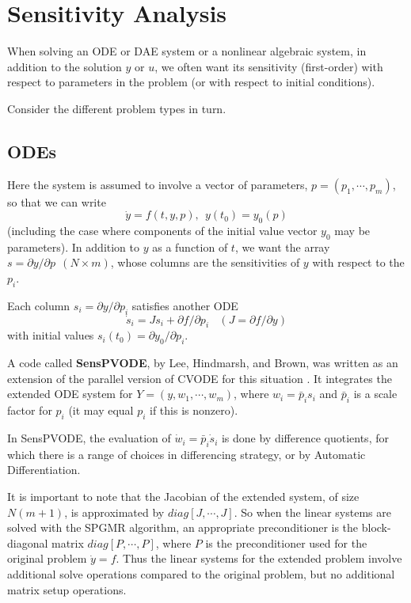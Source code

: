\section{Sensitivity Analysis}

When solving an ODE or DAE system or a nonlinear algebraic system, in
addition to the solution $y$ or $u$, we often want its sensitivity
(first-order) with respect to parameters in the problem (or with
respect to initial conditions).

Consider the different problem types in turn.

\subsection{ODEs}

Here the system is assumed to involve a vector of parameters,
$p = (p_1,\cdots,p_m)$, so that we can write
\[ \dot{y} = f(t,y,p),~~ y(t_0) = y_0(p) \]
(including the case where components of the initial value vector $y_0$
may be parameters).  In addition to $y$ as a function of $t$, we want
the array $s = \partial y / \partial p ~~ (N \times m)$, whose columns
are the sensitivities of $y$ with respect to the $p_i$.

Each column $s_i = \partial y / \partial p_i$ satisfies another ODE
\[ \dot{s}_i = J s_i + \partial f / \partial p_i ~~~~
               (J = \partial f / \partial y) \]
with initial values $s_i(t_0) = \partial y_0 / \partial p_i$.

A code called {\bf SensPVODE}, by Lee, Hindmarsh, and Brown, was
written as an extension of the parallel version of CVODE for this
situation \cite{LHB:00}.  It integrates the extended ODE system for
$Y = (y,w_1,\cdots,w_m)$, where $w_i = \bar{p}_i s_i$ and $\bar{p}_i$
is a scale factor for $p_i$ (it may equal $p_i$ if this is nonzero).

In SensPVODE, the evaluation of $\dot{w}_i = \bar{p}_i \dot{s}_i$ is
done by difference quotients, for which there is a range of choices
in differencing strategy, or by Automatic Differentiation.

It is important to note that the Jacobian of the extended system, of
size $N(m+1)$, is approximated by $diag[J,\cdots,J]$.  So when the
linear systems are solved with the SPGMR algorithm, an appropriate
preconditioner is the block-diagonal matrix $diag[P,\cdots,P]$, where
$P$ is the preconditioner used for the original problem $\dot{y} = f$.
Thus the linear systems for the extended problem involve additional
solve operations compared to the original problem, but no additional
matrix setup operations.

